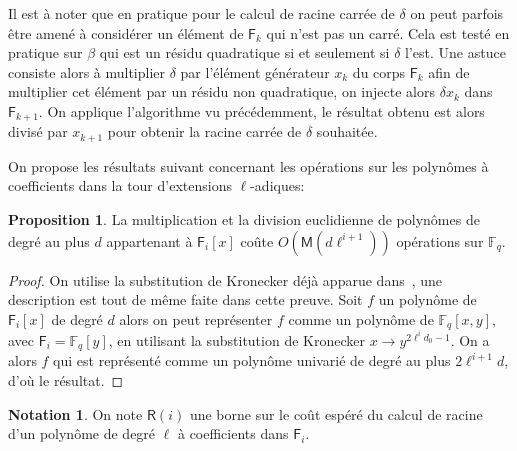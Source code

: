 \documentclass[10pt,a4paper]{book}
\theoremstyle{plain}
\theoremstyle{definition}
\theoremstyle{definition}
\theoremstyle{definition}
\newtheorem{prop}[thm]{Proposition}
\theoremstyle{definition}
\theoremstyle{remark}
\theoremstyle{remark}
\theoremstyle{definition}
\newtheorem{nota}[thm]{Notation}
\begin{document}
Il est à noter que en pratique pour le calcul de racine carrée de $\delta$ on peut parfois être amené à considérer un élément de $\mathsf{F}_k$ qui n'est pas un carré. Cela est testé en pratique sur $\beta$ qui est un résidu quadratique si et seulement si $\delta$ l'est. Une astuce consiste alors à multiplier $\delta$ par l'élément générateur $x_{k}$ du corps $\mathsf{F}_k$ afin  de multiplier cet élément par un résidu non quadratique, on injecte alors $\delta x_k$ dans $\mathsf{F}_{k+1}$. On applique l'algorithme vu précédemment, le résultat obtenu est alors divisé par $x_{k+1}$ pour obtenir la racine carrée de $\delta$ souhaitée.

On propose les résultats suivant concernant les opérations sur les 
polynômes à coefficients dans la tour d'extensions $\ell$-adiques:

\begin{prop}
\label{pro:mult:pol}
La multiplication et la division euclidienne de polynômes de degré au plus $d$ 
appartenant à $\mathsf{F}_i[x]$ coûte $O(\mathsf{M}(d\ell^{i+1}))$ opérations sur 
$\mathbb{F}_q$.
\end{prop}

\begin{proof}
On utilise la substitution de Kronecker déjà apparue 
dans~\cite[Lemma 2.2]{vzGShoup92}, une description est tout de même faite dans 
cette preuve. Soit $f$ un polynôme de $\mathsf{F}_{i}[x]$ de degré $d$ alors on 
peut représenter $f$ comme un polynôme de $\mathbb{F}_q[x,y]$, avec 
$\mathsf{F}_i=\mathbb{F}_q[y]$, en utilisant la substitution de 
Kronecker $x \rightarrow y^{2\ell^{i}d_0-1}$. On a alors $f$ qui est représenté
 comme un polynôme univarié de degré au plus $2\ell^{i+1} d$, d'où le résultat.
\end{proof}

\begin{nota}
On note $\mathsf{R}(i)$ une borne sur le coût espéré du calcul de racine d'un polynôme de degré $\ell$ à coefficients dans $\mathsf{F}_i$.
\end{nota}
\end{document}

